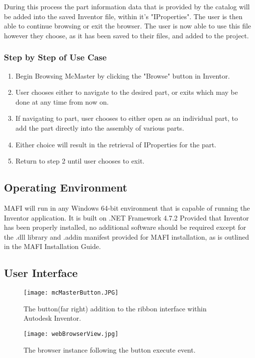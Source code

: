 \documentclass[12pt, letterpaper]{article}
\begin{document}
\newpage
During this process the part information data that is provided by the catalog will be added into the saved Inventor file, within it's "IProperties". The user is then able to continue browsing or exit the browser. The user is now able to use this file however they choose, as it has been saved to their files, and added to the project.
\subsubsection{Step by Step of Use Case}
\begin{enumerate}
    \item Begin Browsing McMaster by clicking the "Browse" button in Inventor.
    \item User chooses either to navigate to the desired part, or exits which may be done at any time from now on.
    \item If navigating to part, user chooses to either open as an individual part, to add the part directly into the assembly of various parts.
    \item Either choice will result in the retrieval of IProperties for the part.
    \item Return to step 2 until user chooses to exit.
\end{enumerate}


\subsection{Operating Environment}
MAFI will run in any Windows 64-bit environment that is capable of running the Inventor application. It is built on .NET Framework 4.7.2 Provided that Inventor has been properly installed, no additional software should be required except for the .dll library and .addin manifest provided for MAFI installation, as is outlined in the MAFI Installation Guide.
\subsection{User Interface}
\begin{figure}[H]
    \centering
    \texttt{[image: mcMasterButton.JPG]}
    \caption{The button(far right) addition to the ribbon interface within Autodesk Inventor.}
\end{figure}
\begin{figure}[H]
    \centering
    \texttt{[image: webBrowserView.jpg]}
    \caption{The browser instance following the button execute event.}
\end{figure}
\end{document}
